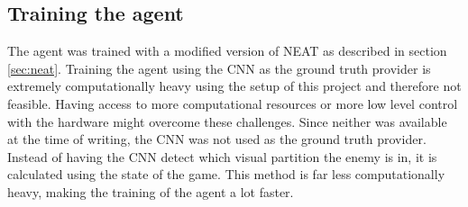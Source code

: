 




%





\subsection{Training the agent}
\label{sub:training-neat}
The agent was trained with a modified version of NEAT as described in section \ref{sec:neat}. Training the agent using the CNN as the ground truth provider is extremely computationally heavy using the setup of this project and therefore not feasible. Having access to more computational resources or more low level control with the hardware might overcome these challenges. Since neither was available at the time of writing, the CNN was not used as the ground truth provider. Instead of having the CNN detect which visual partition the enemy is in, it is calculated using the state of the game. This method is far less computationally heavy, making the training of the agent a lot faster.


